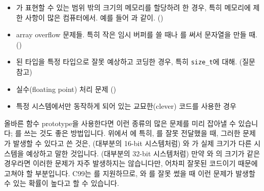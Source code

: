 \begin{faq}
\begin{itemize}
	\item {}가 표현할 수 있는 범위 밖의 크기의 메모리를
		할당하려 한 경우, 특히 메모리에 제한 사항이 많은 컴퓨터에서.
                예를 들어 과 같이.
		()

	\item array overflow 문제들.  특히 작은 임시 버퍼를 쓸 때나
		를 써서 문자열을 만들 때.
                ()

	\item {}된 타입을 특정 타입으로 잘못 예상하고
		코딩한 경우, 특히 \verb+size_t+에 대해. (질문  참고)

	\item 실수(floating point) 처리 문제 ()

	\item 특정 시스템에서만 동작하게 되어 있는 교묘한(clever) 코드를
		사용한 경우
	\end{itemize}

	\noindent 올바른 함수 prototype을 사용한다면 이런 종류의 많은 문제를
	미리 잡아낼 수 있습니다; 를 쓰는 것도 좋은 방법입니다.
\T
	위에서 에 특히, 를 잘못 전달했을 때, 그러한
        문제가 발생할 수 있다고 쓴 것은, (대부분의 16-bit 시스템처럼) 
        와 가 실제 크기가 다른 시스템을 예상하고 말한 것입니다.
        (대부분의 32-bit 시스템처럼) 만약 와 의 크기가
        같은 경우라면 이러한 문제가 자주 발생하지는 않습니다만, 어차피 잘못된 코드이기
        때문에 고쳐야 할 부분입니다. C99는 를 지원하므로, 
        와 를 잘못 썼을 때 이런 문제가 발생할 수 있는
        확률이 높다고 할 수 있습니다.
\end{faq}

